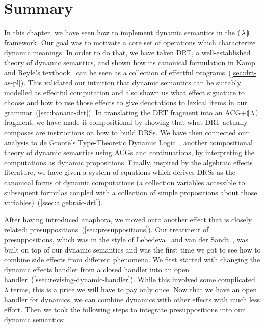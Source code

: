 \section{Summary}
\label{sec:summary-dynamic-semantics}

In this chapter, we have seen how to implement dynamic semantics in the
$\llparenthesis \, \lambda \, \rrparenthesis$ framework. Our goal was to motivate a core set of
operations which characterize dynamic meanings. In order to do that, we
have taken DRT, a well-established theory of dynamic semantics, and shown
how its canonical formulation in Kamp and Reyle's
textbook~\cite{kamp1993discourse} can be seen as a collection of effectful
programs~(\ref{sec:drt-as-pl}). This validated our intuition that dynamic
semantics can be suitably modelled as effectful computation and also shown
us what effect signature to choose and how to use those effects to give
denotations to lexical items in our grammar~(\ref{sec:banana-drt}). In
translating the DRT fragment into an ACG+${\llparenthesis \, \lambda \, \rrparenthesis}$ fragment, we have made it
compositional by showing that what DRT actually composes are instructions
on how to build DRSs. We have then connected our analysis to de Groote's
Type-Theoretic Dynamic Logic~\cite{de2006towards}, another compositional
theory of dynamic semantics using ACGs and continuations, by interpreting
the computations as dynamic propositions. Finally, inspired by the
algebraic effects
literature\cite{hyland2006combining,plotkin2009handlers,pretnar2010logic,plotkin2013handling},
we have given a system of equations which derives DRSs as the canonical
forms of dynamic computations (a collection variables accessible to
subsequent formulas coupled with a collection of simple propositions about
those variables)~(\ref{ssec:algebraic-drt}).

After having introduced anaphora, we moved onto another effect that is
closely related: presuppositions~(\ref{sec:presuppositions}). Our
treatment of presuppositions, which was in the style of
Lebedeva~\cite{lebedeva2012expression} and van der
Sandt~\cite{van1992presupposition}, was built on top of our dynamic
semantics and was the first time we got to see how to combine side
effects from different phenomena. We first started with changing the
dynamic effects handler from a closed handler into an open
handler~(\ref{ssec:revising-dynamic-handler}). While this involved some
complicated $\lambda$ terms, this is a price we will have to pay only
once. Now that we have an open handler for dynamics, we can combine dynamics
with other effects with much less effort. Then we took the following steps
to integrate presuppositions into our dynamic semantics:

